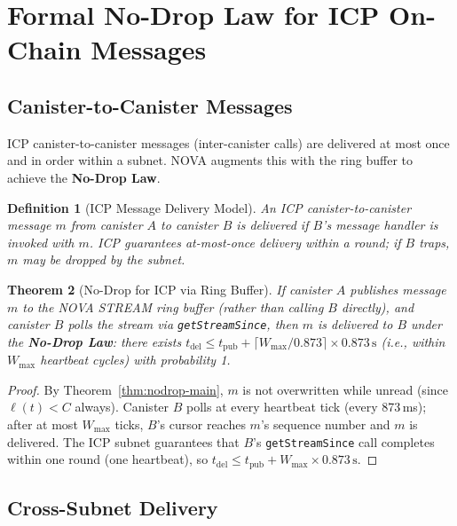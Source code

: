 \documentclass[12pt]{article}
\newtheorem{theorem}{Theorem}
\newtheorem{definition}[theorem]{Definition}
\newcommand{\SCAP}{C}
\newcommand{\NoDrop}{\textbf{No-Drop Law}}
\begin{document}
\section{Formal No-Drop Law for ICP On-Chain Messages}
\label{sec:formal}

\subsection{Canister-to-Canister Messages}

ICP canister-to-canister messages (inter-canister calls) are delivered at most
once and in order within a subnet.  NOVA augments this with the ring buffer to
achieve the \NoDrop{}.

\begin{definition}[ICP Message Delivery Model]
An ICP canister-to-canister message $m$ from canister $A$ to canister $B$ is
\emph{delivered} if $B$'s message handler is invoked with $m$.  ICP guarantees
\emph{at-most-once delivery} within a round; if $B$ traps, $m$ may be dropped
by the subnet.
\end{definition}

\begin{theorem}[No-Drop for ICP via Ring Buffer]
\label{thm:icp-nodrop}
If canister $A$ publishes message $m$ to the NOVA STREAM ring buffer (rather
than calling $B$ directly), and canister $B$ polls the stream via
\texttt{getStreamSince}, then $m$ is delivered to $B$ under the \NoDrop{}:
there exists $t_{\mathrm{del}} \le t_{\mathrm{pub}} + \lceil W_{\max} /
0.873 \rceil \times 0.873\,\mathrm{s}$ (i.e., within $W_{\max}$ heartbeat
cycles) with probability 1.
\end{theorem}

\begin{proof}
By Theorem~\ref{thm:nodrop-main}, $m$ is not overwritten while unread
(since $\ell(t) < \SCAP$ always).  Canister $B$ polls at every heartbeat
tick (every 873\,ms); after at most $W_{\max}$ ticks, $B$'s cursor reaches
$m$'s sequence number and $m$ is delivered.  The ICP subnet guarantees that
$B$'s \texttt{getStreamSince} call completes within one round (one heartbeat),
so $t_{\mathrm{del}} \le t_{\mathrm{pub}} + W_{\max} \times 0.873\,\mathrm{s}$.
\end{proof}

\subsection{Cross-Subnet Delivery}
\end{document}
